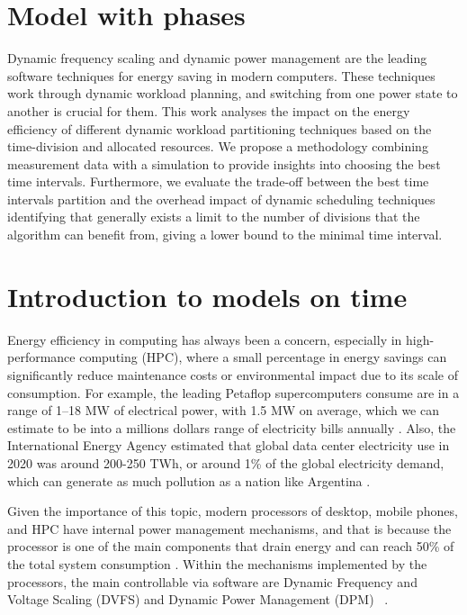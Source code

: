 
\section{Model with phases} \label{sec:model_with_phases}

Dynamic frequency scaling and dynamic power management are the leading software techniques for energy saving in modern computers. These techniques work through dynamic workload planning, and switching from one power state to another is crucial for them. This work analyses the impact on the energy efficiency of different dynamic workload partitioning techniques based on the time-division and allocated resources. We propose a methodology combining measurement data with a simulation to provide insights into choosing the best time intervals. Furthermore, we evaluate the trade-off between the best time intervals partition and the overhead impact of dynamic scheduling techniques identifying that generally exists a limit to the number of divisions that the algorithm can benefit from, giving a lower bound to the minimal time interval.

\section{Introduction to models on time} \label{sec:introduction_to_models_on_time}
Energy efficiency in computing has always been a concern, especially in high-performance computing (HPC), where a small percentage in energy savings can significantly reduce maintenance costs or environmental impact due to its scale of consumption. For example, the leading Petaflop supercomputers consume are in a range of 1–18 MW of electrical power, with 1.5 MW on average, which we can estimate to be into a millions dollars range of electricity bills annually \cite{Group2012HandbookSahni}. Also,  the International Energy Agency  \cite{iea_2021} estimated that global data center electricity use in 2020 was around 200-250 TWh, or around 1\% of the global electricity demand, which can generate as much pollution as a nation like Argentina \cite{Mathew2012Energy-awareNetworks}.

Given the importance of this topic, modern processors of desktop, mobile phones, and HPC  have internal power management mechanisms, and that is because the processor is one of the main components that drain energy and can reach 50\% of the total system consumption \cite{Fan2007, Barroso2007TheComputing, Malladi2012TowardsDRAM}. Within the mechanisms implemented by the processors, the main controllable via software are Dynamic Frequency and Voltage Scaling (DVFS) and Dynamic Power Management (DPM) ~\cite{Rotem2012Power-managementBridge, Brown2005, Hackenberg2015}.

